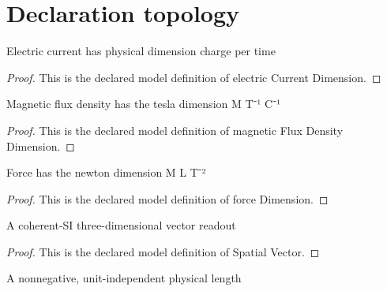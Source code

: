 \section{Declaration topology}
\begin{definition}
  \label{def:physics:phyx-mini-0952:phyxminiproblems-problemphyxmini0952-electriccurrentdimension}
  Electric current has physical dimension charge per time
\end{definition}
\begin{proof}
  This is the declared model definition of electric Current Dimension.
\end{proof}
\begin{definition}
  \label{def:physics:phyx-mini-0952:phyxminiproblems-problemphyxmini0952-magneticfluxdensitydimension}
  Magnetic flux density has the tesla dimension M T⁻¹ C⁻¹
\end{definition}
\begin{proof}
  This is the declared model definition of magnetic Flux Density Dimension.
\end{proof}
\begin{definition}
  \label{def:physics:phyx-mini-0952:phyxminiproblems-problemphyxmini0952-forcedimension}
  Force has the newton dimension M L T⁻²
\end{definition}
\begin{proof}
  This is the declared model definition of force Dimension.
\end{proof}
\begin{definition}
  \label{def:physics:phyx-mini-0952:phyxminiproblems-problemphyxmini0952-spatialvector}
  A coherent-SI three-dimensional vector readout
\end{definition}
\begin{proof}
  This is the declared model definition of Spatial Vector.
\end{proof}
\begin{definition}
  \label{def:physics:phyx-mini-0952:phyxminiproblems-problemphyxmini0952-lengthquantity}
  A nonnegative, unit-independent physical length
\end{definition}

